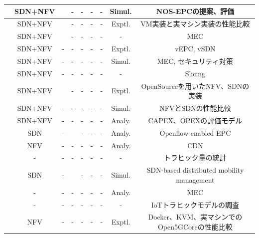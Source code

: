 \documentclass[a4j]{ujarticle}
\begin{document}
\begin{landscape}
\begin{table}[htbp]
{\begin{tabular}{c||c|cc|ccc|c|c}
		\cite{AnInnovativeEPCwithNotOnlyStackforbeyond5GMobileNetworks}&SDN+NFV&\Checkmark&-&-&-&-&Simul.&NOS-EPCの提案、評価 \\ \hline
		\cite{VirtualisingandOrchestratinga5GEvolvedPacketCoreNetwork}&SDN+NFV&\Checkmark&-&-&-&-&Exptl.&VM実装と実マシン実装の性能比較 \\ \hline
		\cite{Software-DefinedControloftheVirtualizedMobilePacketCore}&SDN+NFV&\Checkmark&-&-&-&-&-&MEC \\ \hline
		\cite{IntegratedSDN/NFVOrchestrationfortheDynamicDeploymentofMobileVirtualBackhaulNetworksOveraMultilayer(packet/optical)AggregationInfrastructure}&SDN+NFV&-&-&-&-&-&Exptl.&vEPC, vSDN \\ \hline
		\cite{NetworkServiceChaininginFogandCloudComputingforthe5GEnvironment:DataManagementandSecurityChallenges}&SDN+NFV&-&-&-&-&-&Simul.&MEC, セキュリティ対策 \\ \hline
		\cite{NetworkSlicingfor5GwithSDNNFVConceptsArchitecturesandChallenges}&SDN+NFV&-&-&-&-&-&-&Slicing \\ \hline
		\cite{AComparisonofSDNandNFVforRedesigningtheLTEPacketCore}&SDN+NFV&\Checkmark&-&-&-&-&Exptl.&OpenSourceを用いたNFV、SDNの実装 \\ \hline
		\cite{TowardsaCostOptimalDesignfora5GMobileCoreNetworkBasedonSDNandNFV}&SDN+NFV&-&-&-&-&-&Simul.&NFVとSDNの性能比較\\ \hline
	 	\cite{CostModelingforSDN/NFVBasedMobile5GNetworks}&SDN+NFV&-&-&-&-&-&Analy.&CAPEX、OPEXの評価モデル\\ \hline
 		\cite{ProposalandEvaluationofSDN‐basedMobilePacketCoreNetworks}&SDN&-&\Checkmark&-&-&-&Analy.&Openflow-enabled EPC \\ \hline
		\cite{SlicingVirtualizedEPCbased5GCoreNetworkforContentDelivery}&NFV&-&-&-&-&-&Analy.&CDN \\ \hline
		\cite{Signalingisgrowing50fasterthandatatraffic}&-&-&-&-&-&-&-&トラヒック量の統計\\ \hline
		\cite{ASDNBasedDistributedMobilityManagementinLTEEPCNetwork}&SDN&-&\Checkmark&-&-&-&Simul.&SDN-based distributed mobility management\\ \hline
		\cite{OptimizingServiceReplicationforMobileDelaySensitiveApplicationsin5GEdgeNetwork}&-&-&-&-&-&-&Analy.&MEC\\ \hline
		\cite{IoTTrafficModelsfor5GResearches}&-&-&-&-&-&-&-&IoTトラヒックモデルの調査\\ \hline
		\cite{PerformanceEvaluationofOpen5GCoreoverKVMandDockerbyUsingOpen5GMTC}&NFV&-&-&-&-&-&Exptl.&Docker、KVM、実マシンでのOpen5GCoreの性能比較\\ \hline

\end{tabular}}
\end{table}
\end{landscape}
\end{document}
